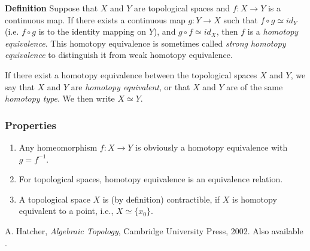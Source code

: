 \documentclass{article}
\begin{document}
{\bf Definition} Suppose that $X$ and $Y$ are topological spaces and 
$f: X \to Y$ is a continuous map. 
If there exists a 
continuous map $g:Y \to X$ such that $f\circ g \simeq id_{Y}$
(i.e. $f\circ g$ is  to the identity 
mapping on $Y$), 
and $g \circ f \simeq id_{X}$, then 
$f$ is a \emph{homotopy equivalence}.
This homotopy equivalence is sometimes called
\emph{strong homotopy equivalence} to distinguish it from
weak homotopy equivalence.

If there exist a homotopy equivalence between the topological 
spaces $X$ and $Y$, we say that $X$ and $Y$ are  
\emph{homotopy equivalent}, or that 
$X$ and $Y$ are of the same \emph{homotopy type}. 
We then write  $X\simeq Y$. 

\subsubsection{Properties}
\begin{enumerate}
\item Any homeomorphism $f:X\to Y$ is obviously a homotopy equivalence with 
$g=f^{-1}$.
\item For topological spaces, homotopy equivalence is an 
equivalence relation.
\item A topological space $X$ is (by definition) contractible, 
if $X$ is homotopy equivalent to a point, i.e., $X\simeq \{x_0\}$.
\end{enumerate}

\begin{thebibliography}{9}
  A. Hatcher, \emph{Algebraic Topology}, Cambridge University Press, 2002. Also available
 .
 \end{thebibliography}
\end{document}

